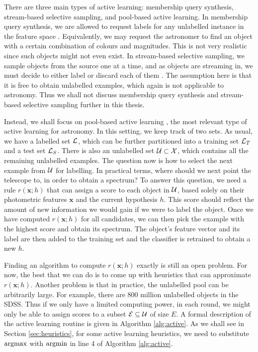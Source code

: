 There are three main types of active learning: membership query synthesis, stream-based selective
sampling, and pool-based active learning. In membership query synthesis, we are allowed to request labels for any unlabelled instance in the feature space
\cite{angluin88}. Equivalently, we may request the astronomer to find an object with a certain
combination of colours and magnitudes. This is not very realistic since such objects might not even
exist. In stream-based selective sampling, we sample objects
from the source one at a time, and as objects are streaming in, we must decide to either label or
discard each of them \cite{cohn94}. The assumption here is that it is free to obtain unlabelled
examples, which again is not applicable to astronomy. Thus we shall not discuss membership query
synthesis and stream-based selective sampling further in this thesis.

Instead, we shall focus on pool-based active learning 
\cite{lewis94}, the most relevant type of active learning for astronomy. In this setting, we keep
track of two sets. As usual, we have a labelled set $\mathcal{L}$, which can be further partitioned
into a training set $\mathcal{L}_T$ and a test set $\mathcal{L}_S$. There is also an unlabelled set
$\mathcal{U} \subset \mathcal{X}$, which contains all the remaining unlabelled examples. The question now is
how to select the next example from $\mathcal{U}$ for labelling. In practical terms, where should
we next point the telescope to, in order to obtain a spectrum? To answer this question, we need a
rule $r(\bm{x}; h)$ that can assign a score to each object in $\mathcal{U}$, based solely on their
photometric features $\bm{x}$ and the current hypothesis $h$. This score should reflect the amount
of new information we would gain if we were to label the object. Once we have computed $r(\bm{x};
h)$ for all candidates, we can then pick the example with the highest score and obtain its
spectrum. The object's feature vector and its label are then added to the training set and the
classifier is retrained to obtain a new $h$.

Finding an algorithm to compute $r(\bm{x}; h)$ exactly is still an open problem. For now, the best
that we can do is to come up with heuristics that can approximate $r(\bm{x}; h)$. Another problem
is that in practice, the unlabelled pool can be arbitrarily large. For example, there are 800
million unlabelled objects in the SDSS. Thus if we only have a limited computing power, in each
round, we might only be able to assign scores to a subset $\mathcal{E} \subseteq \mathcal{U}$ of size
$E$. A formal description of the active learning routine is given in Algorithm \ref{alg:active}. As
we shall see in Section \ref{sec:heuristics}, for some active learning heuristics, we need to
substitute $\argmax$ with $\argmin$ in line 4 of Algorithm \ref{alg:active}.

